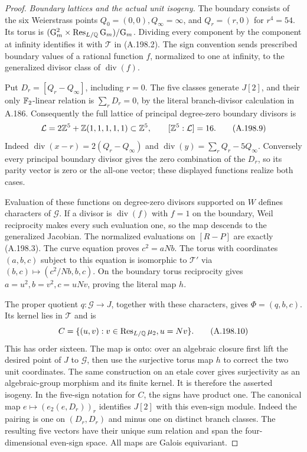 \begin{proof}
\emph{Boundary lattices and the actual unit isogeny.}
The boundary consists of the six Weierstrass points
\(Q_0=(0,0),Q_\infty=\infty\), and
\(Q_r=(r,0)\) for \(r^4=54\).
Its torus is
\((\mathrm G_m^2\times\operatorname{Res}_{L/\mathbb Q}\mathrm G_m)/\mathrm G_m\).
Dividing every component by the component at infinity identifies
it with \(\mathcal T\) in (A.198.2).
The sign convention sends prescribed boundary values of a rational
function \(f\), normalized to one at infinity, to the generalized
divisor class of \(\operatorname{div}(f)\).

Put \(D_r=[Q_r-Q_\infty]\), including \(r=0\).
The five classes generate \(J[2]\), and their only
\(\mathbb F_2\)-linear relation is \(\sum_rD_r=0\), by the literal
branch-divisor calculation in A.186.  Consequently the full
lattice of principal degree-zero boundary divisors is
\[
 \mathcal L=2\mathbb Z^5+\mathbb Z(1,1,1,1,1)\subset\mathbb Z^5,
                         \qquad [\mathbb Z^5:\mathcal L]=16.
\tag{A.198.9}
\]
Indeed \(\operatorname{div}(x-r)=2(Q_r-Q_\infty)\)
and \(\operatorname{div}(y)=\sum_rQ_r-5Q_\infty\).
Conversely every principal boundary divisor gives the zero
combination of the \(D_r\), so its parity vector is zero or
the all-one vector; these displayed functions realize both cases.

Evaluation of these functions on degree-zero divisors supported
on \(W\) defines characters of \(\mathcal G\).  If a divisor
is \(\operatorname{div}(f)\) with \(f=1\) on the boundary,
Weil reciprocity makes every such evaluation one, so the map
descends to the generalized Jacobian.  The normalized evaluations
on \([R-P]\) are exactly (A.198.3).  The curve equation proves
\(c^2=aNb\).  The torus with coordinates \((a,b,c)\) subject
to this equation is isomorphic to \(\mathcal T'\) via
\((b,c)\mapsto(c^2/Nb,b,c)\).
On the boundary torus reciprocity gives
\(a=u^2,b=v^2,c=uNv\), proving the literal map \(h\).

The proper quotient \(q:\mathcal G\to J\), together with these
characters, gives \(\Phi=(q,b,c)\).
Its kernel lies in \(\mathcal T\) and is
\[
 C=\{(u,v):v\in\operatorname{Res}_{L/\mathbb Q}\mu_2, u=Nv\}.
\tag{A.198.10}
\]
This has order sixteen.  The map is onto: over an algebraic
closure first lift the desired point of \(J\) to \(\mathcal G\),
then use the surjective torus map \(h\) to correct the two
unit coordinates.  The same construction on an etale cover gives
surjectivity as an algebraic-group morphism and its finite kernel.
It is therefore the asserted isogeny.
In the five-sign notation for \(C\), the signs have product one.
The canonical map
\(e\mapsto(e_2(e,D_r))_r\) identifies \(J[2]\) with this
even-sign module.  Indeed the pairing is one on \((D_r,D_r)\)
and minus one on distinct branch classes.  The resulting five
vectors have their unique sum relation and span the four-dimensional
even-sign space.  All maps are Galois equivariant.


\end{proof}
